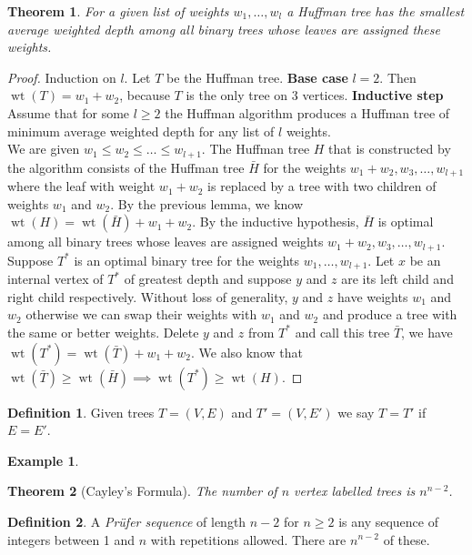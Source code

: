 \documentclass{article}
\newtheorem*{thm}{Theorem}
\theoremstyle{definition}
\newtheorem*{defn}{Definition}
\newtheorem*{ex}{Example}
\DeclareMathOperator{\wt}{wt}
\begin{document}
\begin{thm}
For a given list of weights $w_1,\ldots,w_l$ a Huffman tree has the smallest average weighted depth among all binary trees whose leaves are assigned these weights.
\end{thm}

\begin{proof}
Induction on $l$.
Let $T$ be the Huffman tree.
\textbf{Base case} $l=2$. Then $\wt(T) = w_1 + w_2$, because $T$ is the only tree on 3 vertices.
\textbf{Inductive step} Assume that for some $l\ge 2$ the Huffman algorithm produces a Huffman tree of minimum average weighted depth for any list of $l$ weights. \\
We are given $w_1\le w_2\le \ldots\le w_{l+1}$. The Huffman tree $H$ that is constructed by the algorithm consists of the Huffman tree $\bar{H}$ for the weights $w_1+w_2,w_3,\ldots,w_{l+1}$ where the leaf with weight $w_1+w_2$ is replaced by a tree with two children of weights $w_1$ and $w_2$.
By the previous lemma, we know $\wt(H) = \wt(\bar{H}) + w_1 + w_2$.
By the inductive hypothesis, $\bar{H}$ is optimal among all binary trees whose leaves are assigned weights  $w_1+w_2,w_3,\ldots,w_{l+1}$. \\
Suppose $T^*$ is an optimal binary tree for the weights $w_1,\ldots,w_{l+1}$.
Let $x$ be an internal vertex of $T^*$ of greatest depth and suppose $y$ and $z$ are its left child and right child respectively. Without loss of generality, $y$ and $z$ have weights $w_1$ and $w_2$ otherwise we can swap their weights with $w_1$ and $w_2$ and produce a tree with the same or better weights.
Delete $y$ and $z$ from $T^*$ and call this tree $\bar{T}$, we have $\wt(T^*) = \wt(\bar{T}) + w_1 + w_2$. We also know that $\wt(\bar{T}) \ge \wt(\bar{H})\implies \wt(T^*)\ge \wt(H)$.
\end{proof}


\begin{defn}
Given trees $T=(V,E)$ and $T' = (V,E')$ we say $T=T'$ if $E = E'$.
\end{defn}

\begin{ex}
\end{ex}

\begin{thm}[Cayley's Formula]
The number of $n$ vertex labelled trees is $n^{n-2}$.
\end{thm}

\begin{defn}
A \emph{Pr\"ufer sequence} of length $n-2$ for $n\ge 2$ is any sequence of integers between 1 and $n$ with repetitions allowed.
There are $n^{n-2}$ of these.
\end{defn}
\end{document}
